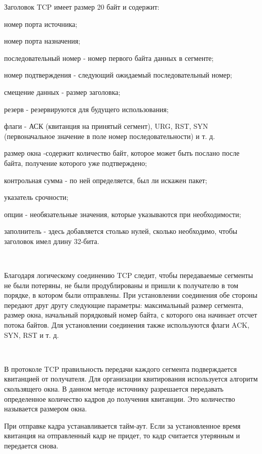 \documentclass{article}
\begin{document}
Заголовок TCP имеет размер 20 байт и содержит:
\begin{compactitem}
\item номер порта источника;
\item номер порта назначения;
\item последовательный номер - номер первого байта данных в сегменте;
\item номер подтверждения - следующий ожидаемый последовательный номер;
\item смещение данных - размер заголовка;
\item резерв - резервируются для будущего использования;
\item флаги - АСК (квитанция на принятый сегмент), URG, RST, SYN (первоначальное значение в поле номер последовательности) и т. д.
\item размер окна -содержит количество байт, которое может быть послано после байта, получение которого уже подтверждено;
\item контрольная сумма - по ней определяется, был ли искажен пакет;
\item указатель срочности;
\item опции - необязательные значения, которые указываются при необходимости;
\item заполнитель - здесь добавляется столько нулей, сколько необходимо, чтобы заголовок имел длину 32-бита.
\end{compactitem}

~\

Благодаря логическому соединению TCP следит, чтобы передаваемые сегменты не были потеряны, не были продублированы и пришли к получателю в том порядке, в котором были отправлены.
При установлении соединения обе стороны передают друг другу следующие параметры: максимальный размер сегмента, размер окна, начальный порядковый номер байта, с которого она начинает отсчет потока байтов. Для установлении соединения также используются флаги ACK, SYN, RST и т. д.

~\

В протоколе TCP правильность передачи каждого сегмента подверждается квитанцией от получателя. Для организации квитирования используется алгоритм скользящего окна. В данном методе источнику разрешается передавать определенное количество кадров до получения квитанции. Это количество называется размером окна. 

При отправке кадра устанавливается тайм-аут. Если за установленное время квитанция на отправленный кадр не придет, то кадр считается утерянным и передается снова. 
\end{document}
